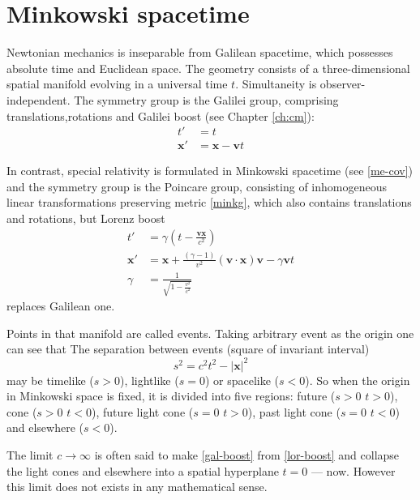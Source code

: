 \section{Minkowski spacetime}
\label {sec:sr-minkowski-spacetime}
Newtonian mechanics is inseparable from Galilean spacetime,
which possesses
absolute time and Euclidean space. The geometry consists of a 
three-dimensional spatial manifold evolving in a universal time $t$.
Simultaneity is observer-independent. The symmetry group is 
the Galilei group, comprising translations,rotations and Galilei boost
(see Chapter \ref{ch:cm}):
\begin{equation}
   \label {gal-boost}
   \begin{split}
       t' &= t \\
       \bm x' &= \bm x -\bm v t
   \end{split}
\end{equation}

In contrast, special relativity is formulated in Minkowski spacetime (see \ref{me-cov})
 and the symmetry group is the Poincare group, consisting of
 inhomogeneous linear transformations preserving metric \eqref{minkg}, which also
 contains translations and rotations, but Lorenz boost
 \begin{equation}
    \label {lor-boost}
    \begin{split}
        t' &= \gamma (t-\frac{\bm v \bm x}{c^2}) \\
        \bm x' &= \bm x + \frac{(\gamma -1)}{v^2} (\bm v \cdot \bm x) \bm v-\gamma \bm v t  \\
        \gamma &= \frac{1}{\sqrt{1-\frac{v^2}{c^2}}}
    \end{split}
 \end{equation}
 replaces Galilean one.

Points in that manifold are called events. Taking arbitrary 
event as the origin one can see that
The separation between events (square of invariant interval) 
\begin{equation}
   \label {interval}
    s^2=c^2 t^2-|\bm x|^2
\end{equation}
may be timelike ($s>0$), lightlike ($s=0$) or spacelike ($s<0$).
So when the origin in Minkowski space is fixed, it is divided into
five regions: future ($ s>0 $ $ t>0 $), cone ($ s>0 $ $ t<0 $),
future light cone ($ s=0 $ $ t>0 $), past light cone ($ s=0 $ $ t<0 $)
and elsewhere ($ s<0 $).

The limit $c \to \infty$ is often said to make \eqref{gal-boost} 
from \eqref{lor-boost} 
and collapse the light cones and elsewhere 
into a spatial hyperplane $ t=0 $ --- now. However this limit
does not exists in any mathematical sense. 


